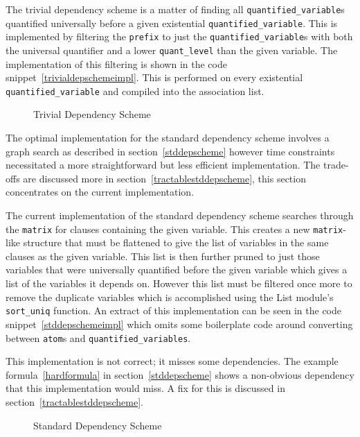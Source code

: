 The trivial dependency scheme is a matter of finding all \texttt{quantified\_variable}s quantified universally before a given existential \texttt{quantified\_variable}. This is implemented by filtering the \texttt{prefix} to just the \texttt{quantified\_variable}s with both the universal quantifier and a lower \texttt{quant\_level} than the given variable. The implementation of this filtering is shown in the code snippet~\ref{trivialdepschemeimpl}. This is performed on every existential \texttt{quantified\_variable} and compiled into the association list.

\begin{figure}[H]
\caption{Trivial Dependency Scheme}
\begin{CenteredBox}

\end{CenteredBox}
\end{figure}

The optimal implementation for the standard dependency scheme involves a graph search as described in section~\ref{stddepscheme} however time constraints necessitated a more straightforward but less efficient implementation. The trade-offs are discussed more in section~\ref{tractablestddepscheme}, this section concentrates on the current implementation.

The current implementation of the standard dependency scheme searches through the \texttt{matrix} for clauses containing the given variable. This creates a new \texttt{matrix}-like structure that must be flattened to give the list of variables in the same clauses as the given variable. This list is then further pruned to just those variables that were universally quantified before the given variable which gives a list of the variables it depends on. However this list must be filtered once more to remove the duplicate variables which is accomplished using the List module's \texttt{sort\_uniq} function. An extract of this implementation can be seen in the code snippet~\ref{stddepschemeimpl} which omits some boilerplate code around converting between \texttt{atom}s and \texttt{quantified\_variables}.

This implementation is not correct; it misses some dependencies. The example formula~\ref{hardformula} in section~\ref{stddepscheme} shows a non-obvious dependency that this implementation would miss. A fix for this is discussed in section~\ref{tractablestddepscheme}.

\begin{figure}[H]
\caption{Standard Dependency Scheme}
\begin{CenteredBox}

\end{CenteredBox}
\end{figure}

